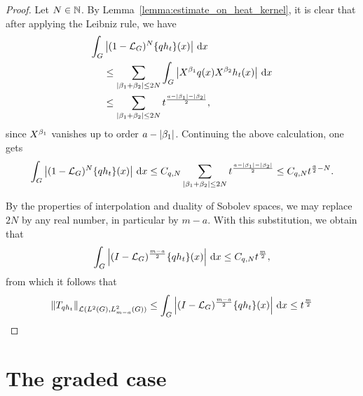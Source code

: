 \begin{proof}
    Let $N \in \N$.
    By Lemma~\ref{lemma:estimate_on_heat_kernel},
    it is clear that after applying the Leibniz rule,
    we have
    \begin{align*}
        \int_\Group &\abs {(1 - \Laplacian)^N \{q h_t\}(x)} \dd x\\
        &\leq \sum_{\abs{\beta_1 + \beta_2} \leq 2N} \int_\Group \abs {\LeftDifferentialOperator {\beta_1} q(x) \LeftDifferentialOperator {\beta_2} h_t(x)} \dd x\\
        &\leq \sum_{\abs{\beta_1 + \beta_2} \leq 2N} t^{\frac {a - \abs {\beta_1} - \abs{\beta_2}} 2},
    \end{align*}
    since $\LeftDifferentialOperator {\beta_1}$ vanishes up to order $a - \abs {\beta_1}$.
    Continuing the above calculation,
    one gets
    \begin{align*}
        \int_\Group \abs {(1 - \Laplacian)^N \{q h_t\}(x)} \dd x
        \leq C_{q, N} \sum_{\abs{\beta_1 + \beta_2} \leq 2N} t^{\frac {a - \abs {\beta_1} - \abs{\beta_2}} 2}
        \leq C_{q, N} t^{\frac a 2 - N}.
    \end{align*}

    By the properties of interpolation and duality of Sobolev spaces,
    we may replace $2N$ by any real number,
    in particular by $m - a$.
    With this substitution,
    we obtain that
    \begin{align*}
        \int_\Group \abs {\BesselPotential {m - a} \{q h_t\}(x)} \dd x
        \leq C_{q, N} t^{\frac m 2},
    \end{align*}
    from which it follows that
    \begin{align*}
        \norm [\Lin {\Lebesgue 2 \Group, \Sobolev {m - a}}] {T_{q h_t}}
        \leq \int_\Group \abs {\BesselPotential {m - a} \{q h_t\}(x)} \dd x
        \leq t^{\frac m 2}
    \end{align*}
\end{proof}

\section{The graded case}
